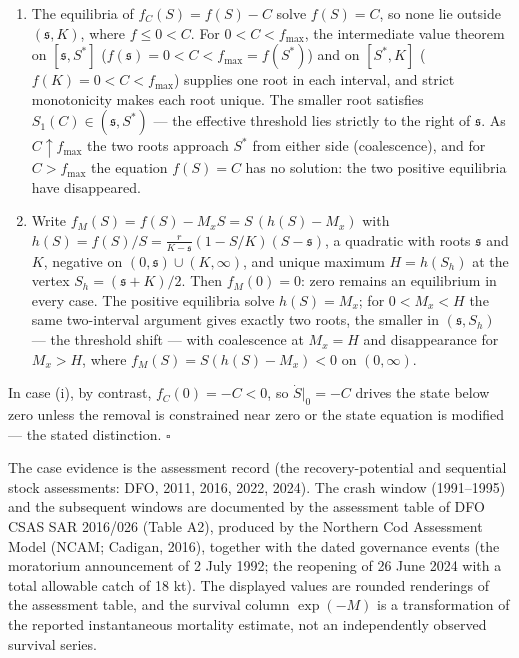 \documentclass[11pt]{article}
\begin{document}
\begin{enumerate}
\def\labelenumi{(\roman{enumi})}
\item
  The equilibria of \(f_C(S) = f(S) - C\) solve \(f(S) = C\), so none
  lie outside \((\mathfrak s,K)\), where \(f \le 0 < C\). For
  \(0 < C < f_{\max}\), the intermediate value theorem on
  \([\mathfrak s, S^*]\)
  (\(f(\mathfrak s) = 0 < C < f_{\max} = f(S^*)\)) and on \([S^*, K]\)
  (\(f(K) = 0 < C < f_{\max}\)) supplies one root in each interval, and
  strict monotonicity makes each root unique. The smaller root satisfies
  \(S_1(C) \in (\mathfrak s, S^*)\) --- the effective threshold lies
  strictly to the right of \(\mathfrak s\). As \(C \uparrow f_{\max}\)
  the two roots approach \(S^*\) from either side (coalescence), and for
  \(C > f_{\max}\) the equation \(f(S) = C\) has no solution: the two
  positive equilibria have disappeared.
\item
  Write \(f_M(S) = f(S) - M_x S = S\, (h(S) - M_x)\) with
  \(h(S) = f(S)/S = \frac{r}{K-\mathfrak s}(1-S/K)(S-\mathfrak s)\), a
  quadratic with roots \(\mathfrak s\) and \(K\), negative on
  \((0,\mathfrak s)\cup(K,\infty)\), and unique maximum \(H = h(S_h)\)
  at the vertex \(S_h = (\mathfrak s+K)/2\). Then \(f_M(0) = 0\): zero
  remains an equilibrium in every case. The positive equilibria solve
  \(h(S) = M_x\); for \(0 < M_x < H\) the same two-interval argument
  gives exactly two roots, the smaller in \((\mathfrak s, S_h)\) --- the
  threshold shift --- with coalescence at \(M_x = H\) and disappearance
  for \(M_x > H\), where \(f_M(S) = S(h(S)-M_x) < 0\) on \((0,\infty)\).
\end{enumerate}

In case (i), by contrast, \(f_C(0) = -C < 0\), so \(\dot S|_0 = -C\)
drives the state below zero unless the removal is constrained near zero
or the state equation is modified --- the stated distinction. \ensuremath{\square}

The case evidence is the assessment record (the recovery-potential and
sequential stock assessments: DFO, 2011, 2016, 2022, 2024). The crash
window (1991--1995) and the subsequent windows are documented by the
assessment table of DFO CSAS SAR 2016/026 (Table A2), produced by the
Northern Cod Assessment Model (NCAM; Cadigan, 2016), together with the
dated governance events (the moratorium announcement of 2 July 1992; the
reopening of 26 June 2024 with a total allowable catch of 18 kt). The
displayed values are rounded renderings of the assessment table, and the
survival column \(\exp(-M)\) is a transformation of the reported
instantaneous mortality estimate, not an independently observed survival
series.
\end{document}
